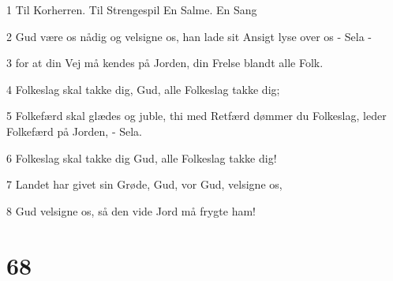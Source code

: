 \par 1 Til Korherren. Til Strengespil En Salme.  En Sang
\par 2 Gud være os nådig og velsigne os, han lade sit Ansigt lyse over os - Sela -
\par 3 for at din Vej må kendes på Jorden, din Frelse blandt alle Folk.
\par 4 Folkeslag skal takke dig, Gud, alle Folkeslag takke dig;
\par 5 Folkefærd skal glædes og juble, thi med Retfærd dømmer du Folkeslag, leder Folkefærd på Jorden, - Sela.
\par 6 Folkeslag skal takke dig Gud, alle Folkeslag takke dig!
\par 7 Landet har givet sin Grøde, Gud, vor Gud, velsigne os,
\par 8 Gud velsigne os, så den vide Jord må frygte ham!

\chapter{68}

